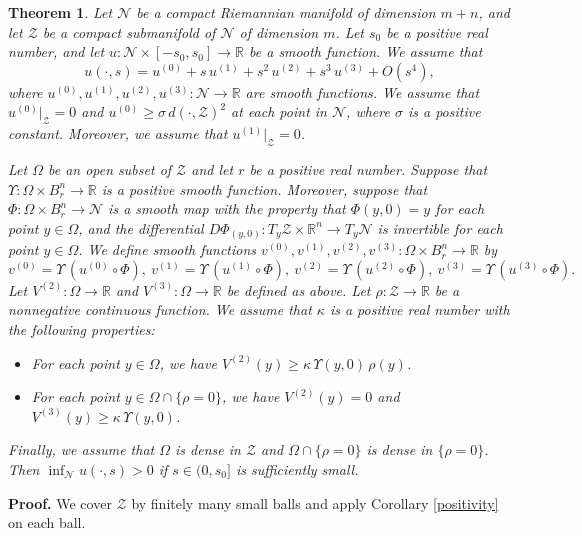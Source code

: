 \documentclass[11pt]{amsart}
\newtheorem{theorem}{Theorem}[section]
\theoremstyle{definition}
\begin{document}
\begin{theorem} 
\label{positivity.manifold.version}
Let $\mathcal{N}$ be a compact Riemannian manifold of dimension $m+n$, and let $\mathcal{Z}$ be a compact submanifold of $\mathcal{N}$ of dimension $m$. Let $s_0$ be a positive real number, and let $u: \mathcal{N} \times [-s_0,s_0] \to \mathbb{R}$ be a smooth function. We assume that 
\[u(\cdot,s) = u^{(0)} + s \, u^{(1)} + s^2 \, u^{(2)} + s^3 \, u^{(3)} + O(s^4),\]
where $u^{(0)},u^{(1)},u^{(2)},u^{(3)}: \mathcal{N} \to \mathbb{R}$ are smooth functions. We assume that $u^{(0)}|_{\mathcal{Z}} = 0$ and $u^{(0)} \geq \sigma \, d(\cdot,\mathcal{Z})^2$ at each point in $\mathcal{N}$, where $\sigma$ is a positive constant. Moreover, we assume that $u^{(1)}|_{\mathcal{Z}} = 0$.

Let $\Omega$ be an open subset of $\mathcal{Z}$ and let $r$ be a positive real number. Suppose that $\Upsilon: \Omega \times B_r^n \to \mathbb{R}$ is a positive smooth function. Moreover, suppose that $\Phi: \Omega \times B_r^n \to \mathcal{N}$ is a smooth map with the property that $\Phi(y,0) = y$ for each point $y \in \Omega$, and the differential $D\Phi_{(y,0)}: T_y \mathcal{Z} \times \mathbb{R}^n \to T_y \mathcal{N}$ is invertible for each point $y \in \Omega$. We define smooth functions $v^{(0)},v^{(1)},v^{(2)},v^{(3)}: \Omega \times B_r^n \to \mathbb{R}$ by 
\[v^{(0)} = \Upsilon \, (u^{(0)} \circ \Phi),\ v^{(1)} = \Upsilon \, (u^{(1)} \circ \Phi),\ v^{(2)} = \Upsilon \, (u^{(2)} \circ \Phi),\ v^{(3)} = \Upsilon \, (u^{(3)} \circ \Phi).\] 
Let $V^{(2)}: \Omega \to \mathbb{R}$ and $V^{(3)}: \Omega \to \mathbb{R}$ be defined as above. Let $\rho: \mathcal{Z} \to \mathbb{R}$ be a nonnegative continuous function. We assume that $\kappa$ is a positive real number with the following properties:
\begin{itemize} 
\item For each point $y \in \Omega$, we have $V^{(2)}(y) \geq \kappa \, \Upsilon(y,0) \, \rho(y)$. 
\item For each point $y \in \Omega \cap \{\rho = 0\}$, we have $V^{(2)}(y) = 0$ and $V^{(3)}(y) \geq \kappa \, \Upsilon(y,0)$.
\end{itemize} 
Finally, we assume that $\Omega$ is dense in $\mathcal{Z}$ and $\Omega \cap \{\rho = 0\}$ is dense in $\{\rho = 0\}$. Then $\inf_{\mathcal{N}} u(\cdot,s) > 0$ if $s \in (0,s_0]$ is sufficiently small.
\end{theorem}

\textbf{Proof.} We cover $\mathcal{Z}$ by finitely many small balls and apply Corollary \ref{positivity} on each ball. \\
\end{document}
